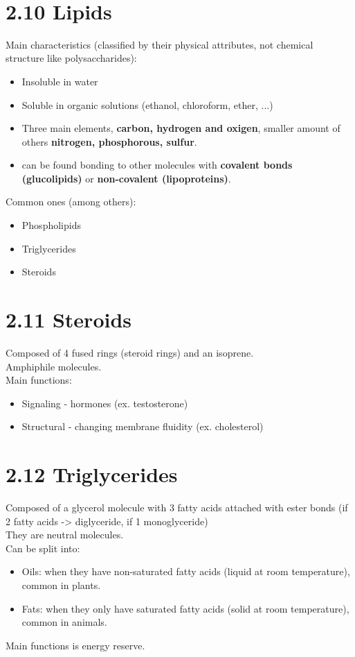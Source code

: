 \documentclass[a4paper,landscape,10pt]{cheatsheet}
\begin{document}
\hfill\\
\section*{2.10 Lipids}
Main characteristics (classified by their physical attributes, not chemical structure like polysaccharides):
\begin{itemize}
  \item Insoluble in water
  \item Soluble in organic solutions (ethanol, chloroform, ether, ...)
  \item Three main elements, \textbf{carbon, hydrogen and oxigen}, smaller amount of others \textbf{nitrogen,
          phosphorous, sulfur}.
  \item can be found bonding to other molecules with \textbf{covalent bonds (glucolipids)} or \textbf{non-covalent (lipoproteins)}.
\end{itemize}

Common ones (among others):
\begin{itemize}
  \item Phospholipids
  \item Triglycerides
  \item Steroids
\end{itemize}

\section*{2.11 Steroids}
Composed of 4 fused rings (steroid rings) and an isoprene. \\
Amphiphile  molecules.\\
\medskip
Main functions:
\begin{itemize}
  \item Signaling - hormones (ex. testosterone)
  \item Structural - changing membrane fluidity (ex. cholesterol)
\end{itemize}

\section*{2.12 Triglycerides}
Composed of a glycerol molecule with 3 fatty acids attached with ester bonds (if 2 fatty acids -> diglyceride, if 1 monoglyceride)\\
\medskip
They are neutral  molecules.\\
\medskip
Can be split into:
\begin{itemize}
  \item Oils: when they have non-saturated fatty acids (liquid at room temperature), common in plants.
  \item Fats: when they only have saturated fatty acids (solid at room temperature), common in animals.
\end{itemize}
Main functions is energy reserve.
\end{document}
